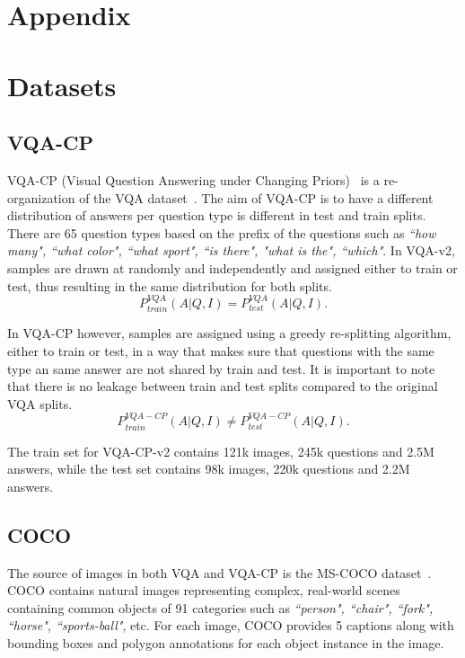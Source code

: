 \section*{Appendix}

\section{Datasets}
    \subsection{VQA-CP}
    VQA-CP (Visual Question Answering under Changing Priors)~\cite{vqa-cp} is a re-organization of the VQA dataset~\cite{antol2015vqa,goyal2017making}.
    The aim of VQA-CP is to have a different distribution of answers per question type is different in test and train splits.
    There are 65 question types based on the prefix of the questions such as \textit{``how many", ``what color", ``what sport", ``is there", "what is the", ``which"}.
    In VQA-v2, samples are drawn at randomly and independently and assigned either to train or test, thus resulting in the same distribution for both splits.
    \begin{equation*}
        P^{VQA}_{train}(A | Q, I) = P^{VQA}_{test}(A | Q, I).
    \end{equation*}
    
    In VQA-CP however, samples are assigned using a greedy re-splitting algorithm,  either to train or test, in a way that makes sure that questions with the same type an same answer are not shared by train and test.
    It is important to note that there is no leakage between train and test splits compared to the original VQA splits.
    \begin{equation*}
        P^{VQA-CP}_{train}(A | Q, I) \neq P^{VQA-CP}_{test}(A | Q, I).
    \end{equation*}
    
    The train set for VQA-CP-v2 contains 121k images, 245k questions and 2.5M answers, while the test set contains 98k images, 220k questions and 2.2M answers.
    
    \subsection{COCO}
    The source of images in both VQA and VQA-CP is the MS-COCO dataset~\cite{lin2014microsoft}.
    COCO contains natural images representing complex, real-world scenes containing common objects of 91 categories such as \textit{``person", ``chair", ``fork", ``horse", ``sports-ball"}, etc.
    For each image, COCO provides 5 captions along with bounding boxes and polygon annotations for each object instance in the image.
    


